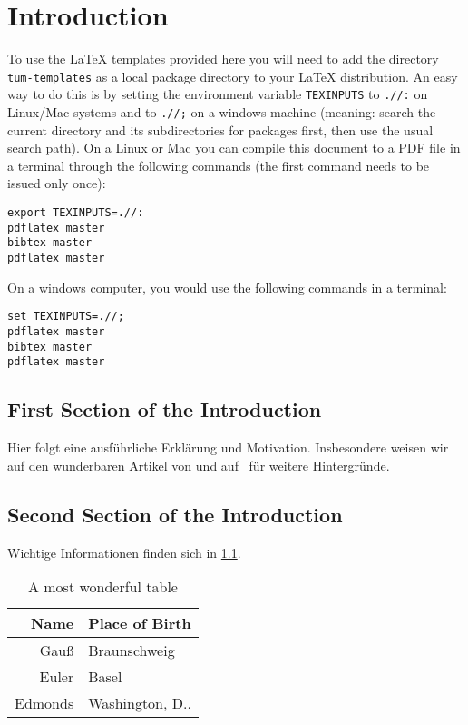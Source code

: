 \chapter{Introduction}

To use the \LaTeX{} templates provided here you will need to add the directory \verb|tum-templates| as a local package directory to your \LaTeX{} distribution. An easy way to do this is by setting the environment variable \verb|TEXINPUTS| to \verb|.//:| on Linux/Mac systems and to \verb|.//;| on a windows machine (meaning: search the current directory and its subdirectories for packages first, then use the usual search path). On a Linux or Mac you can compile this document to a PDF file in a terminal through the following commands (the first command needs to be issued only once):
\begin{verbatim}
export TEXINPUTS=.//:
pdflatex master
bibtex master
pdflatex master
\end{verbatim}

On a windows computer, you would use the following commands in a terminal:

\begin{verbatim}
set TEXINPUTS=.//;
pdflatex master
bibtex master
pdflatex master
\end{verbatim}


\section{First Section of the Introduction}%
\label{sec:first-sect-intr}
Hier folgt eine ausführliche Erklärung und Motivation. Insbesondere weisen wir auf den wunderbaren Artikel von \textcite{Edmonds:1965} und auf~\cite{GareyJohnson:1979} für weitere Hintergründe.

\section{Second Section of the Introduction}%
\label{sec:second-sect-intr}

Wichtige Informationen finden sich in \cref{tab:wonderful-table}.

\begin{table}[hbt]
	\centering
	\begin{tabular}{rl}
		\toprule%
		\textbf{Name} & \textbf{Place of Birth} \\ \midrule
		Gauß          & Braunschweig \\
		Euler         & Basel \\
		Edmonds       & Washington, D.\@C.\@ \\
		\bottomrule
	\end{tabular}

	\caption{A most wonderful table}%
	\label{tab:wonderful-table}
\end{table}


